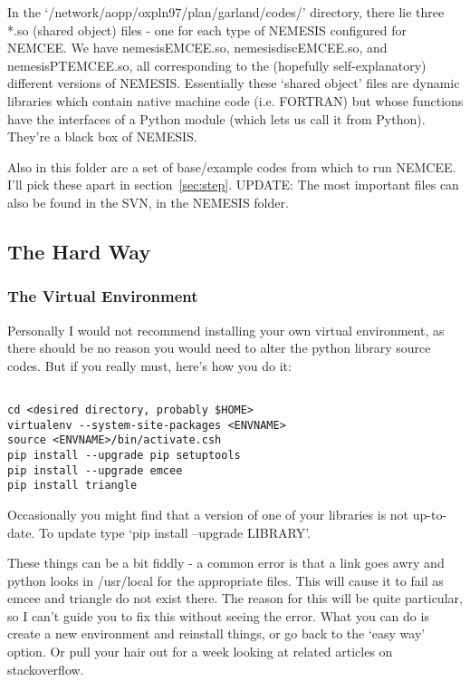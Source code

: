 \documentclass[11pt, a4paper,titlepage]{report}
\begin{document}
In the `/network/aopp/oxpln97/plan/garland/codes/' directory, there lie three *.so (shared object) files - one for each type of NEMESIS configured for NEMCEE. We have nemesisEMCEE.so, nemesisdiscEMCEE.so, and nemesisPTEMCEE.so, all corresponding to the (hopefully self-explanatory) different versions of NEMESIS. Essentially these `shared object' files are dynamic libraries which contain native machine code (i.e. FORTRAN) but whose functions have the interfaces of a Python module (which lets us call it from Python). They're a black box of NEMESIS. 

Also in this folder are a set of base/example codes from which to run NEMCEE. I'll pick these apart in section~\ref{sec:step}. UPDATE: The most important files can also be found in the SVN, in the NEMESIS folder.

\subsection{The Hard Way}

\subsubsection{The Virtual Environment}

Personally I would not recommend installing your own virtual environment, as there should be no reason you would need to alter the python library source codes. But if you really must, here's how you do it:

\lstset{language=csh} 
\begin{lstlisting}

cd <desired directory, probably $HOME>
virtualenv --system-site-packages <ENVNAME>
source <ENVNAME>/bin/activate.csh
pip install --upgrade pip setuptools
pip install --upgrade emcee
pip install triangle
\end{lstlisting}

Occasionally you might find that a version of one of your libraries is not up-to-date. To update type `pip install --upgrade LIBRARY'. 

These things can be a bit fiddly - a common error is that a link goes awry and python looks in /usr/local for the appropriate files. This will cause it to fail as emcee and triangle do not exist there. The reason for this will be quite particular, so I can't guide you to fix this without seeing the error. What you can do is create a new environment and reinstall things, or go back to the `easy way' option. Or pull your hair out for a week looking at related articles on stackoverflow.
\end{document}
